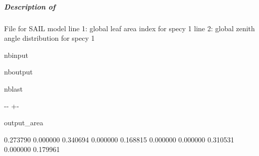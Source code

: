 \documentclass[letterpaper,10pt,english]{sphinxmanual}
\begin{document}
\subparagraph{Description of }
\label{\detokenize{misc_functionnalities:Description-of-out.dang}}
\sphinxAtStartPar
File for SAIL model \sphinxhyphen{} line 1: global leaf area index for specy 1 \sphinxhyphen{} line 2: global zenith angle distribution for specy 1

\begin{sphinxuseclass}{nbinput}
{
\begin{sphinxVerbatim}[commandchars=\\\{\}]
\llap{\color{nbsphinxin}[15]:\,\hspace{\fboxrule}\hspace{\fboxsep}}    
    
       
         
\end{sphinxVerbatim}
}

\end{sphinxuseclass}
\begin{sphinxuseclass}{nboutput}
\begin{sphinxuseclass}{nblast}
{

\kern-\sphinxverbatimsmallskipamount\kern-\baselineskip
\kern+\FrameHeightAdjust\kern-\fboxrule
\vspace{\nbsphinxcodecellspacing}

\begin{sphinxuseclass}{output_area}
\begin{sphinxuseclass}{}


\begin{sphinxVerbatim}[commandchars=\\\{\}]
0.273790
0.000000 0.340694 0.000000 0.168815 0.000000 0.000000 0.310531 0.000000 0.179961
\end{sphinxVerbatim}



\end{sphinxuseclass}
\end{sphinxuseclass}
}

\end{sphinxuseclass}
\end{sphinxuseclass}
\end{document}
